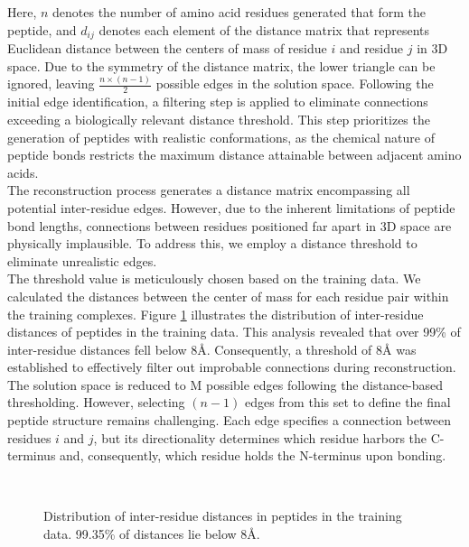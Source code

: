 Here, $n$ denotes the number of amino acid residues generated that form the peptide, and $d_{ij}$ denotes each element of the distance matrix that represents Euclidean distance between the centers of mass of residue $i$ and residue $j$ in 3D space. Due to the symmetry of the distance matrix, the lower triangle can be ignored, leaving $\frac{n \times (n-1)}{2}$ possible edges in the solution space. Following the initial edge identification, a filtering step is applied to eliminate connections exceeding a biologically relevant distance threshold. This step prioritizes the generation of peptides with realistic conformations, as the chemical nature of peptide bonds restricts the maximum distance attainable between adjacent amino acids. \\
The reconstruction process generates a distance matrix encompassing all potential inter-residue edges. However, due to the inherent limitations of peptide bond lengths, connections between residues positioned far apart in 3D space are physically implausible. To address this, we employ a distance threshold to eliminate unrealistic edges. \\

The threshold value is meticulously chosen based on the training data. We calculated the distances between the center of mass for each residue pair within the training complexes. Figure \ref{fig:irds} illustrates the distribution of inter-residue distances of peptides in the training data. This analysis revealed that over 99\% of inter-residue distances fell below 8Å. Consequently, a threshold of 8Å was established to effectively filter out improbable connections during reconstruction. \\
The solution space is reduced to M possible edges following the distance-based thresholding. However, selecting $(n-1)$ edges from this set to define the final peptide structure remains challenging. Each edge specifies a connection between residues $i$ and $j$, but its directionality determines which residue harbors the C-terminus and, consequently, which residue holds the N-terminus upon bonding.  \\

\begin{figure}
  \center

   \\

  \caption{Distribution of inter-residue distances in peptides in the training data. 99.35\% of distances lie below 8Å.}

  \label{fig:irds}
\end{figure}

